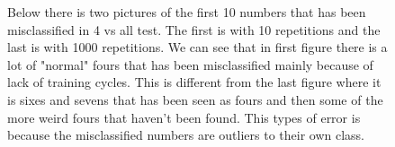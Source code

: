 \documentclass[paper=a4, fontsize=11pt]{scrartcl} %
\numberwithin{equation}{section} %
\numberwithin{figure}{section} %
\numberwithin{table}{section} %
\begin{document}
 	\begin{figure}
Below there is two pictures of the first 10 numbers that has been misclassified in 4 vs all test. The first is with 10 repetitions and the last is with 1000 repetitions. We can see that in first figure there is a lot of "normal" fours that has been misclassified mainly because of lack of training cycles. This is different from the last figure where it is sixes and sevens that has been seen as fours and then some of the more weird fours that haven't been found. This types of error is because the misclassified numbers are outliers to their own class. \\ \\
    ~
    \newline
	\end{figure}
\end{document}
